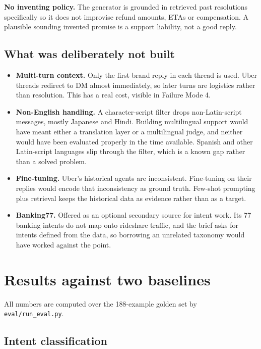\documentclass[11pt,a4paper]{article}
\begin{document}
\textbf{No inventing policy.} The generator is grounded in retrieved past resolutions
specifically so it does not improvise refund amounts, ETAs or compensation. A plausible
sounding invented promise is a support liability, not a good reply.

\subsection{What was deliberately not built}

\begin{itemize}
\item \textbf{Multi-turn context.} Only the first brand reply in each thread is used.
Uber threads redirect to DM almost immediately, so later turns are logistics rather than
resolution. This has a real cost, visible in Failure Mode 4.
\item \textbf{Non-English handling.} A character-script filter drops non-Latin-script
messages, mostly Japanese and Hindi. Building multilingual support would have meant
either a translation layer or a multilingual judge, and neither would have been evaluated
properly in the time available. Spanish and other Latin-script languages slip through the
filter, which is a known gap rather than a solved problem.
\item \textbf{Fine-tuning.} Uber's historical agents are inconsistent. Fine-tuning on
their replies would encode that inconsistency as ground truth. Few-shot prompting plus
retrieval keeps the historical data as evidence rather than as a target.
\item \textbf{Banking77.} Offered as an optional secondary source for intent work. Its 77
banking intents do not map onto rideshare traffic, and the brief asks for intents defined
from the data, so borrowing an unrelated taxonomy would have worked against the point.
\end{itemize}

\section{Results against two baselines}

All numbers are computed over the 188-example golden set by \texttt{eval/run\_eval.py}.

\subsection{Intent classification}
\end{document}
